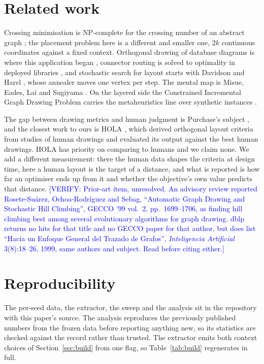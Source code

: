 \documentclass[11pt]{article}
\newcommand{\unver}[1]{\textcolor{blue}{[VERIFY: #1]}}
\begin{document}
\section{Related work}

Crossing minimisation is NP-complete for the crossing number of an abstract graph \cite{gj83};
the placement problem here is a different and smaller one, $2k$ continuous coordinates against a
fixed context. Orthogonal drawing of database diagrams is where this application began
\cite{tdb88,tamassia87}, connector routing is solved to optimality in deployed libraries
\cite{wms09}, and stochastic search for layout starts with Davidson and Harel \cite{dh96}, whose
annealer moves one vertex per step. The mental map is Misue, Eades, Lai and Sugiyama
\cite{misue95}. On the layered side the Constrained Incremental Graph Drawing Problem carries
the metaheuristics line over synthetic instances \cite{cigdp19}.

The gap between drawing metrics and human judgment is Purchase's subject \cite{purchase02}, and
the closest work to ours is HOLA \cite{hola16}, which derived orthogonal layout criteria from
studies of human drawings and evaluated its output against the best human drawings. HOLA has
priority on comparing to humans and we claim none. We add a different measurement: there the
human data shapes the criteria at design time, here a human layout is the target of a distance,
and what is reported is how far an optimiser ends up from it and whether the objective's own
value predicts that distance.
\unver{Prior-art item, unresolved. An advisory review reported Rosete-Su\'arez,
Ochoa-Rodr\'iguez and Sebag, ``Automatic Graph Drawing and Stochastic Hill Climbing'', GECCO '99
vol.\ 2, pp.\ 1699--1706, as finding hill climbing best among several evolutionary algorithms for
graph drawing. dblp returns no hits for that title and no GECCO paper for that author, but does
list ``Hacia un Enfoque General del Trazado de Grafos'', \emph{Inteligencia Artificial}
3(8):18--26, 1999, same authors and subject. Read before citing either.}

\section*{Reproducibility}

The per-seed data, the extractor, the sweep and the analysis sit in the repository with this
paper's source. The analysis reproduces the previously published numbers from the frozen data
before reporting anything new, so its statistics are checked against the record rather than
trusted. The extractor emits both context choices of Section~\ref{sec:build} from one flag, so
Table~\ref{tab:build} regenerates in full.
\end{document}
